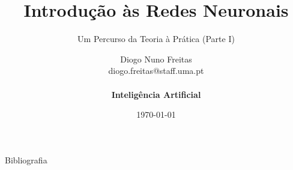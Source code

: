 \documentclass[10pt]{beamer}
\title{Introdução às Redes Neuronais}
\subtitle{Um Percurso da Teoria à Prática \tiny{(Parte I)} }
\date{\today}
\author{Diogo Nuno Freitas \\ diogo.freitas@staff.uma.pt \\ \\ \textbf{Inteligência Artificial} \\}
\institute{\hfill\texttt{[image: img/logotipos\_UMa-02.eps]}}
\begin{document}
\maketitle


\appendix

\begin{frame}{Bibliografia}

  
  
  \nocite{*}

\end{frame}

\maketitle
\end{document}
